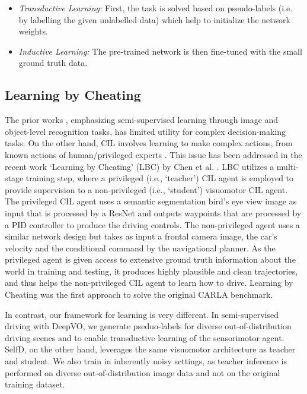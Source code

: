 \documentclass[12pt, letterpaper,cleardoubleempty,BCOR1cm]{scrbook}
\begin{document}
\begin{itemize}
\item \emph{Transductive Learning:} First, the task is solved based on pseudo-labels
(i.e. by labelling the given unlabelled data) which help to initialize the
network weights.
\item \emph{Inductive Learning:} The pre-trained network is then fine-tuned with the
small ground truth data.
\end{itemize}

\subsection{Learning by Cheating}
\label{sec:orgc656657}
The prior works \cite{Caine2021,Yang2021, Lee2013,Rizve2021}, emphasizing
semi-supervised learning through image and object-level recognition tasks, has
limited utility for complex decision-making tasks. On the other hand, CIL
involves learning to make complex actions, from known actions of
human/privileged experts \cite{Codevilla2017,Codevilla2019,Prakash2021}. This
issue has been addressed in the recent work `Learning by Cheating' (LBC) by Chen
et al. \cite{Chen2019}. LBC utilizes a multi-stage training step, where a
privileged (i.e., ‘teacher’) CIL agent is employed to provide supervision to a
non-privileged (i.e., ‘student’) visuomotor CIL agent. The privileged CIL agent
uses a semantic segmentation bird’s eye view image as input that is processed by
a ResNet and outputs waypoints that are processed by a PID controller to produce
the driving controls. The non-privileged agent uses a similar network design but
takes as input a frontal camera image, the car’s velocity and the conditional
command by the navigational planner. As the privileged agent is given access to
extensive ground truth information about the world in training and testing, it
produces highly plausible and clean trajectories, and thus helps the
non-privileged CIL agent to learn how to drive. Learning by Cheating was the
first approach to solve the original CARLA benchmark.


In contrast, our framework for learning is very different. In semi-supervised
driving with DeepVO, we generate pseduo-labels for diverse out-of-distribution
driving scenes and to enable transductive learning of the sensorimotor
agent. SelfD, on the other hand, leverages the same visuomotor architecture as
teacher and student. We also train in inherently noisy settings, as teacher
inference is performed on diverse out-of-distribution image data and not on the
original training dataset.
\end{document}
